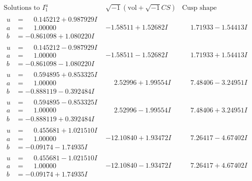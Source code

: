 \documentclass[1p]{elsarticle_modified}
\theoremstyle{definition}
\newcommand{\I}{\sqrt{-1}}
\begin{document}
$$\begin{array}{c|c|c}  
\text{Solutions to }I^u_{1}& \I (\text{vol} + \sqrt{-1}CS) & \text{Cusp shape}\\
 \hline 
\begin{aligned}
u &= \phantom{-}0.145212 + 0.987929 I \\
a &= \phantom{-}1.00000\phantom{ +0.000000I} \\
b &= -0.861098 + 1.080220 I\end{aligned}
 & -1.58511 + 1.52682 I & \phantom{-}1.71933 - 1.54413 I \\ \hline\begin{aligned}
u &= \phantom{-}0.145212 - 0.987929 I \\
a &= \phantom{-}1.00000\phantom{ +0.000000I} \\
b &= -0.861098 - 1.080220 I\end{aligned}
 & -1.58511 - 1.52682 I & \phantom{-}1.71933 + 1.54413 I \\ \hline\begin{aligned}
u &= \phantom{-}0.594895 + 0.853325 I \\
a &= \phantom{-}1.00000\phantom{ +0.000000I} \\
b &= -0.888119 - 0.392484 I\end{aligned}
 & \phantom{-}2.52996 + 1.99554 I & \phantom{-}7.48406 - 3.24951 I \\ \hline\begin{aligned}
u &= \phantom{-}0.594895 - 0.853325 I \\
a &= \phantom{-}1.00000\phantom{ +0.000000I} \\
b &= -0.888119 + 0.392484 I\end{aligned}
 & \phantom{-}2.52996 - 1.99554 I & \phantom{-}7.48406 + 3.24951 I \\ \hline\begin{aligned}
u &= \phantom{-}0.455681 + 1.021510 I \\
a &= \phantom{-}1.00000\phantom{ +0.000000I} \\
b &= -0.09174 - 1.74935 I\end{aligned}
 & -12.10840 + 1.93472 I & \phantom{-}7.26417 - 4.67402 I \\ \hline\begin{aligned}
u &= \phantom{-}0.455681 - 1.021510 I \\
a &= \phantom{-}1.00000\phantom{ +0.000000I} \\
b &= -0.09174 + 1.74935 I\end{aligned}
 & -12.10840 - 1.93472 I & \phantom{-}7.26417 + 4.67402 I \\ \hline\begin{aligned}

\end{aligned}
\end{array}$$
\end{document}
